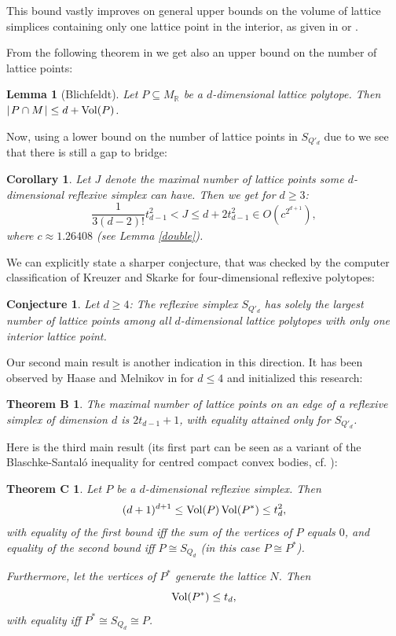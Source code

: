 \documentclass[a4paper,twoside]{article}
\newcommand{\card}[1]{{\mid\! #1 \!\mid}}
\def\R{{\mathbb R}}
\def\vol{{\rm Vol}}
\def\MR{{M_{\R}}}
\newtheorem*{theoremC*}{Theorem C}
\newtheorem*{theoremB*}{Theorem B}
\newtheorem{corollary}[theorem]{Corollary}
\newtheorem{lemma}[theorem]{Lemma}
\newtheorem{conjecture}[theorem]{Conjecture}
\begin{document}
This bound vastly improves on general upper bounds on the volume of lattice simplices containing only one lattice point 
in the interior, as given in \cite{LZ91} or \cite{Pik01}. 

\smallskip

From the following theorem in \cite{Bli14} we get also an upper bound on the number of lattice points:

\begin{lemma}[Blichfeldt]
Let $P \subseteq \MR$ be a $d$-dimensional lattice polytope. Then $\card{P \cap M} \leq d + \vol(P)$.
\end{lemma}

Now, using a lower bound on the number of lattice points in $S_{Q'_d}$ due to \cite{ZPW82} 
we see that there is still a gap to bridge:

\begin{corollary}
Let $J$ denote the maximal number of lattice points some $d$-dimensional reflexive simplex can have. Then 
we get for $d \geq 3$:
\[\frac{1}{3 (d-2)!} t_{d-1}^2 < J \leq d + 2 t_{d-1}^2 \in O(c^{2^{d+1}}),\]
where $c \approx 1.26408$ (see Lemma \ref{double}).
\label{ptcoro}
\end{corollary}

We can explicitly state a sharper conjecture, that was checked 
by the computer classification of Kreuzer and Skarke \cite{KS04,KS05} for four-dimensional reflexive polytopes:

\begin{conjecture}{\rm 
Let $d \geq 4$: The reflexive simplex $S_{Q'_d}$ has solely the largest number of lattice points among all $d$-dimensional lattice polytopes 
with only one interior lattice point.
}
\end{conjecture}

Our second main result is another indication in this direction. It has been observed by Haase and Melnikov in \cite{HM04} 
for $d \leq 4$ and initialized this research:

\begin{theoremB*}
The maximal number of lattice points on an edge of a reflexive simplex of dimension $d$ is 
$2 t_{d-1} + 1$, with equality attained only for $S_{Q'_d}$.
\label{theBs}
\end{theoremB*}

Here is the third main result (its first part can be seen as a variant of the Blaschke-Santal\'o inequality for 
centred compact convex bodies, cf. \cite[p.165]{Lut93}):

\begin{theoremC*}
Let $P$ be a $d$-dimensional reflexive simplex. Then
\[(d+1)^{d+1} \leq \vol(P) \, \vol(P^*) \leq t^2_d,\]
with equality of the first bound iff the sum of the vertices of $P$ equals $0$, and equality of the second bound 
iff $P \cong S_{Q_d}$ (in this case $P \cong P^*$). 

\smallskip

Furthermore, let the vertices of $P^*$ generate the lattice $N$. Then
\[\vol(P^*) \leq t_d,\]
with equality iff $P^* \cong S_{Q_d} \cong P$.
\label{theCs}
\end{theoremC*}
\end{document}
